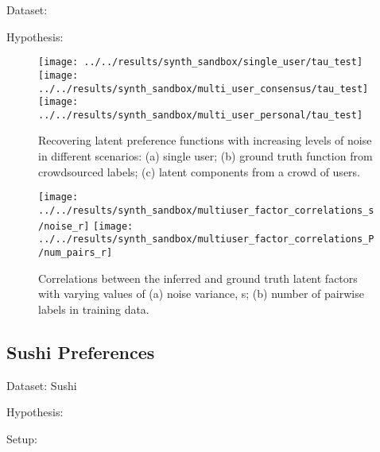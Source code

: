 Dataset:

Hypothesis: 

\begin{figure}
\texttt{[image: ../../results/synth\_sandbox/single\_user/tau\_test]}
\texttt{[image: ../../results/synth\_sandbox/multi\_user\_consensus/tau\_test]}
\texttt{[image: ../../results/synth\_sandbox/multi\_user\_personal/tau\_test]}
\caption{Recovering latent preference functions with increasing levels of noise
in different scenarios: 
(a) single user; 
(b) ground truth function from crowdsourced labels; 
(c) latent components from a crowd of users.
}
\end{figure}

\begin{figure}
\texttt{[image: ../../results/synth\_sandbox/multiuser\_factor\_correlations\_s/noise\_r]}
\texttt{[image: ../../results/synth\_sandbox/multiuser\_factor\_correlations\_P/num\_pairs\_r]}
\caption{Correlations between the inferred and ground truth latent factors with varying values of
(a) noise variance, s; 
(b) number of pairwise labels in training data. 
}
\end{figure}

\subsection{Sushi Preferences}\label{sec:exp_small}

Dataset: Sushi

Hypothesis: 


Setup:

